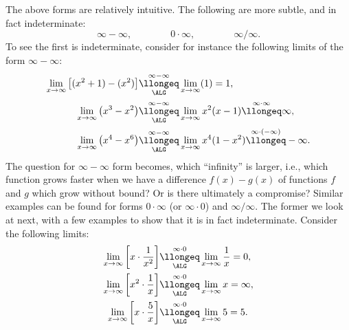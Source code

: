 The above forms are relatively intuitive.  The following are
more subtle, and in fact indeterminate:
$$\infty-\infty,\qquad\qquad 0\cdot\infty,\qquad\qquad \infty/\infty.$$
To see the first is indeterminate, consider for instance the following 
limits of the form $\infty-\infty$:\footnotemark
\bex
\begin{align*}
\lim_{x\to\infty}\left[(x^2+1)-(x^2)\right]&
\underset{\ALG}{\overset{\infty-\infty}{\llongeq}}
\lim_{x\to\infty}(1)=1,\\
\lim_{x\to\infty}\left(x^3-x^2\right)&
\underset{\ALG}{\overset{\infty-\infty}{\llongeq}}
\lim_{x\to\infty}x^2(x-1)
\overset{\infty\cdot\infty}\llongeq\infty,\\
\lim_{x\to\infty}\left(x^4-x^6\right)&
\underset{\ALG}{\overset{\infty-\infty}{\llongeq}}
\lim_{x\to\infty}x^4(1-x^2)
\overset{\infty\cdot(-\infty)}{\llongeq}-\infty.
\end{align*}
\label{Infty-InftyExamples}\eex
The question for $\infty-\infty$ form becomes, which ``infinity'' is larger, i.e.,
which function grows faster
when we have a difference $f(x)-g(x)$ of functions
$f$ and $g$ which grow without bound?  Or is there
ultimately a compromise?  Similar 
examples can be found for forms $0\cdot\infty$ (or $\infty\cdot0$)
and $\infty/\infty$.  The former we look at next, with
a few examples to show that it is in fact indeterminate.
\bex Consider the following limits:
\begin{align*}
\lim_{x\to\infty}\left[x\cdot\frac1{x^2}\right]
  &\underset{\ALG}{\overset{\infty\cdot0}{\llongeq}}
  \lim_{x\to\infty}\frac1x=0,\\
\lim_{x\to\infty}\left[x^2\cdot\frac1{x}\right]
  &\underset{\ALG}{\overset{\infty\cdot0}{\llongeq}}
  \lim_{x\to\infty}x=\infty,\\
\lim_{x\to\infty}\left[x\cdot\frac5{x}\right]
  &\underset{\ALG}{\overset{\infty\cdot0}{\llongeq}}
  \lim_{x\to\infty}5=5.\\
\end{align*}
\label{InfinityTimesZeroExample}\eex

